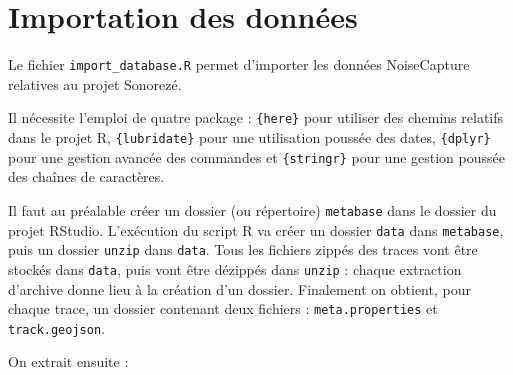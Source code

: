 \documentclass[11pt]{article}\usepackage[]{graphicx}\usepackage[]{color}
\makeatletter
\newcommand{\hlnum}[1]{\textcolor[rgb]{0.063,0.58,0.627}{#1}}%
\newcommand{\hlstr}[1]{\textcolor[rgb]{0.063,0.58,0.627}{#1}}%
\newcommand{\hlopt}[1]{\textcolor[rgb]{0.196,0.196,0.196}{#1}}%
\newcommand{\hlstd}[1]{\textcolor[rgb]{0.196,0.196,0.196}{#1}}%
\newcommand{\hlkwb}[1]{\textcolor[rgb]{0.627,0,0.314}{#1}}%
\newcommand{\hlkwd}[1]{\textcolor[rgb]{0.78,0.227,0.412}{#1}}%
\newenvironment{kframe}{%
 \def\at@end@of@kframe{}%
 \ifinner\ifhmode%
  \def\at@end@of@kframe{\end{minipage}}%
  \begin{minipage}{\columnwidth}%
 \fi\fi%
 \def\FrameCommand##1{\hskip\@totalleftmargin \hskip-\fboxsep
 \colorbox{shadecolor}{##1}\hskip-\fboxsep
     \hskip-\linewidth \hskip-\@totalleftmargin \hskip\columnwidth}%
 \MakeFramed {\advance\hsize-\width
   \@totalleftmargin\z@ \linewidth\hsize
   \@setminipage}}%
 {\par\unskip\endMakeFramed%
 \at@end@of@kframe}
\newenvironment{knitrout}{}{} %
\newcommand{\type}[1]{\textcolor{RedOrange}{\texttt{#1}}}
\makeatother
\begin{document}
\section{Importation des données}



Le fichier \type{import\_database.R} permet d'importer les données NoiseCapture relatives au projet Sonorezé.

Il nécessite l'emploi de quatre package : \type{\{here\}} pour utiliser des chemins relatifs dans le projet R, \type{\{lubridate\}} pour une utilisation poussée des dates, \type{\{dplyr\}} pour une gestion avancée des commandes et \type{\{stringr\}} pour une gestion poussée des chaînes de caractères.

Il faut au préalable créer un dossier (ou répertoire) \type{metabase} dans le dossier du projet RStudio. L'exécution du script R va créer un dossier \type{data} dans \type{metabase}, puis un dossier \type{unzip} dans \type{data}. Tous les fichiers zippés des traces vont être stockés dans \type{data}, puis vont être dézippés dans \type{unzip} : chaque extraction d'archive donne lieu à la création d'un dossier. Finalement on obtient, pour chaque trace, un dossier contenant deux fichiers : \type{meta.properties} et \type{track.geojson}.

On extrait ensuite :
\end{document}
